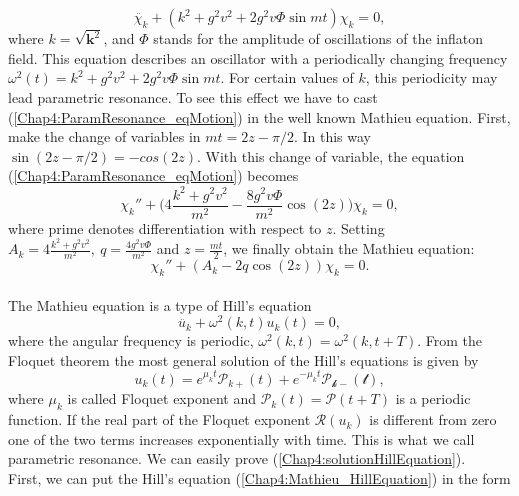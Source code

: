 \documentclass[11pt,a4paper,twoside]{book}
\begin{document}
\begin{equation}
	\label{Chap4:ParamResonance_eqMotion}
	\ddot{\chi_{k}} + (k^{2} + g^{2}v^{2} + 2g^{2}v \Phi \sin mt)\chi_{k} = 0,
\end{equation}
where $ k=\sqrt{\textbf{k}^{2}} $, and $\Phi$ stands for the amplitude of oscillations of the inflaton field. This equation describes an oscillator with a periodically changing frequency $ \omega^{2}(t) = k^{2} + g^{2}v^{2} + 2g^{2}v\Phi \sin mt $. For certain values of $ k $, this periodicity may lead parametric resonance. To see this effect we have to cast (\ref{Chap4:ParamResonance_eqMotion}) in the well known Mathieu equation. First, make the change of variables in $ mt=2z-\pi/2 $. In this way $ \sin (2z-\pi/2)=-cos (2z)  $. With this change of variable, the equation (\ref{Chap4:ParamResonance_eqMotion}) becomes
\begin{equation}
\label{Chap4:ParamResonance_eqMotion2}
\chi_{k}'' + \Bigg(4\frac{k^{2} + g^{2}v^{2}}{m^{2}}-\frac{8g^{2}v\Phi}{m^{2}} \cos(2z)\Bigg)\chi_{k} = 0,
\end{equation}
where prime denotes differentiation with respect to $ z $.
  Setting $ A_{k}=4\frac{k^{2} + g^{2}v^{2}}{m^{2}},\  q=\frac{4g^{2}v\Phi}{m^{2}} $ and $ z=\frac{mt}{2} $, we finally obtain the Mathieu equation:
\begin{equation}
	\label{Chap4:ParamResonance_MathieuEquation}
	\chi_{k}''+(A_{k} - 2q\cos(2z))\chi_{k}=0.
\end{equation}
\\
The Mathieu equation is a type of Hill's equation
\begin{equation}
	\label{Chap4:Mathieu_HillEquation}
	\ddot{u_{k}} + \omega^{2}(k,t)u_{k}(t) = 0,
\end{equation}
where the angular frequency is periodic, $ \omega^{2}(k,t)=\omega^{2}(k,t+T) $.
From the Floquet theorem the most general solution of the Hill's equations is given by
\begin{equation}
\label{Chap4:solutionHillEquation}
u_{k}(t) = e^{\mu_{k}t}\mathcal{P}_{k+}(t) + e^{-\mu_{k}t}\mathcal{P_{k-}(t)},
\end{equation}
where $\mu_{k}$ is called Floquet exponent and $\mathcal{P}_{k}(t)=\mathcal{P}(t+T)$ is a periodic function. If the real part of the Floquet exponent $\mathcal{R}(u_{k}) $ is different from zero one of the two terms increases exponentially with time. This is what we call parametric resonance. We can easily prove (\ref{Chap4:solutionHillEquation}).\\
First, we can put the Hill's equation (\ref{Chap4:Mathieu_HillEquation}) in the form
\end{document}

